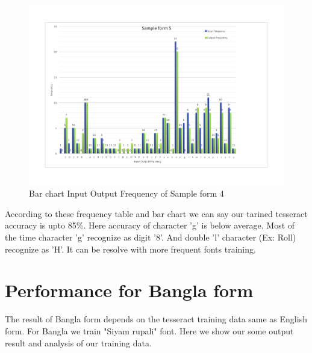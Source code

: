 \begin{figure}[H]
\centering
\includegraphics[width=1\textwidth]{form5.pdf}
\caption {Bar chart Input Output Frequency of Sample form 4}
\label {fig:bar5}
\end{figure}

According to these frequency table and bar chart we can say our tarined tesseract accuracy is upto 85\%. Here accuracy of character 'g' is below average. Most of the time character 'g' recognize as digit '8'. And double 'l' character (Ex: Roll) recognize as 'H'. It can be resolve with more frequent fonts training.

\section{Performance for Bangla form}
The result of Bangla form depends on the tesseract training data same as English form. For Bangla we train "Siyam rupali" font. Here we show our some output result and analysis of our training data.
